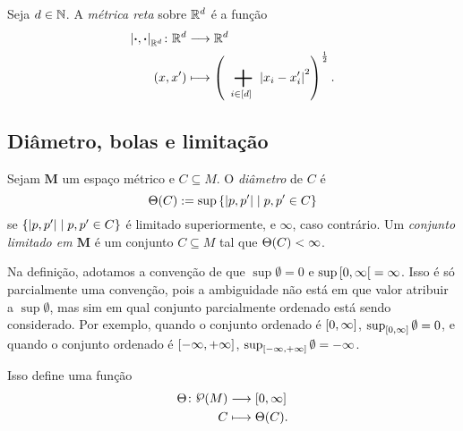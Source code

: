 \begin{definition}
Seja $d \in \mathbb{N}$. A \emph{métrica reta} sobre $\mathbb{R}^d$ é a função
	\begin{align*}
	\func{\dist{\var}{\var}_{\R^d}}{\R^d}{\R^d}{(x,x')}{\left( \sum_{i \in [d]} \abs{x_i-x'_i}^2 \right)^{\frac{1}{2}}}.
	\end{align*}
\end{definition}





\subsection{Diâmetro, bolas e limitação}

\begin{definition}
Sejam $\bm M$ um espaço métrico e $C \subseteq M$. O \emph{diâmetro} de $C$ é
	\begin{equation*}
	\Theta(C) := \sup\left\{ \left\vert{p},{p'}\right\vert \;\middle\vert\; p,p' \in C \right\}
	\end{equation*}
se $\left\{ \left\vert{p},{p'}\right\vert \;\middle\vert\; p,p' \in C \right\}$ é limitado superiormente, e $\infty$, caso contrário. Um \emph{conjunto limitado em $\bm M$} é um conjunto $C \subseteq M$ tal que $\Theta(C) < \infty$.
\end{definition}

Na definição, adotamos a convenção de que $\sup \emptyset = 0$ e $\sup \left[0,\allowbreak \infty\right[ = \infty$. Isso é só parcialmente uma convenção, pois a ambiguidade não está em que valor atribuir a $\sup \emptyset$, mas sim em qual conjunto parcialmente ordenado está sendo considerado. Por exemplo, quando o conjunto ordenado é $\left[0,\allowbreak \infty\right]$, $\sup_{\left[0,\allowbreak \infty\right]} \emptyset = 0$, e quando o conjunto ordenado é $\left[-\infty,\allowbreak +\infty\right]$, $\sup_{\left[-\infty,\allowbreak +\infty\right]} \emptyset = -\infty$.

Isso define uma função
	\begin{align*}
	\func{\diam}{\p(M)}{\intff{0}{\infty}}{C}{\diam(C)}.
	\end{align*}

